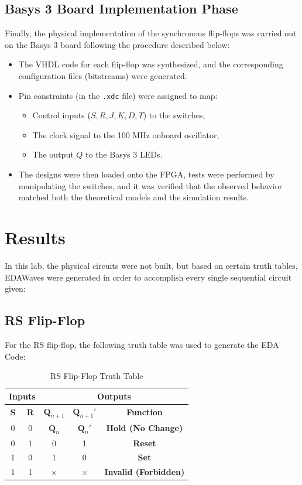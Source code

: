 \documentclass[12pt]{article}  %
\begin{document}
\subsection{Basys 3 Board Implementation Phase}
Finally, the physical implementation of the synchronous flip-flops was carried out on the Basys 3 board following the procedure described below:
\begin{itemize}
    \item The VHDL code for each flip-flop was synthesized, and the corresponding configuration files (bitstreams) were generated.
    \item Pin constraints (in the \texttt{.xdc} file) were assigned to map:
    \begin{itemize}
        \item Control inputs ($S, R, J, K, D, T$) to the switches,
        \item The clock signal to the 100 MHz onboard oscillator,
        \item The output $Q$ to the Basys 3 LEDs.
    \end{itemize}
    \item The designs were then loaded onto the FPGA, tests were performed by manipulating the switches, and it was verified that the observed behavior matched both the theoretical models and the simulation results.
\end{itemize}

\section{Results} %
In this lab, the physical circuits were not built, but based on certain truth tables, EDAWaves were generated in order to accomplish every single sequential circuit given:
\subsection{RS Flip-Flop}
For the RS flip-flop, the following truth table was used to generate the EDA Code:
\begin{table}[h]
    \centering
    \caption{RS Flip-Flop Truth Table}
    \label{tab:rs_ff_truth_table}
    \begin{tabular}{|c|c||c|c|c|}
        \hline
        \multicolumn{2}{|c||}{\textbf{Inputs}} & \multicolumn{3}{c|}{\textbf{Outputs}} \\
        \hline
        $\mathbf{S}$ & $\mathbf{R}$ & $\mathbf{Q}_{n+1}$ & $\mathbf{Q}_{n+1}'$ & \textbf{Function} \\
        \hline
        \hline
        0 & 0 & $\mathbf{Q}_n$ & $\mathbf{Q}_n'$ & \textbf{Hold (No Change)} \\
        \hline
        0 & 1 & 0 & 1 & \textbf{Reset} \\
        \hline
        1 & 0 & 1 & 0 & \textbf{Set} \\
        \hline
        1 & 1 & $\times$ & $\times$ & \textbf{Invalid (Forbidden)} \\
        \hline
    \end{tabular}
\end{table}
\end{document}
